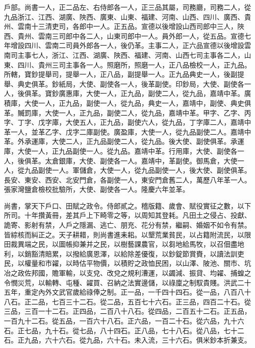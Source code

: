 戶部。尚書一人，正二品左、右侍郎各一人，正三品其屬，司務廳，司務二人，從九品浙江、江西、湖廣、陜西、廣東、山東、福建、河南、山西、四川、廣西、貴州、雲南十三清吏司，各郎中一人。正五品。宣德以後增設山西司郎中三人，陜西、貴州、雲南三司郎中各二人，山東司郎中一人。員外郎一人，從五品。宣德七年增設四川、雲南二司員外郎各一人，後仍革。主事二人，正六品宣德以後增設雲南司主事七人，浙江、江西、湖廣、陜西、福建、河南、山西七司主事各二人，山東、四川、貴州三司主事各一人。照磨所，照磨一人，正八品檢校一人，正九品。所轄，寶鈔提舉司，提舉一人，正八品，副提舉一人。正九品典史一人，後副提舉、典史俱革。鈔紙局，大使、副使各一人，後革副使。印鈔局，大使、副使各一人，後俱革。寶鈔廣惠庫，大使一人，正九品，副使二人，從九品，嘉靖中革。廣積庫，大使一人，正九品，副使一人，從九品，典史一人，嘉靖中，副使、典史俱革。贓罰庫，大使一人，正九品，副使二人，從九品，嘉靖中革。甲字、乙字、丙字、丁字、戊字庫，大使五人，正九品，副使六人，從九品，丁字庫二人，嘉靖中革一人，並革乙字、戊字二庫副使。廣盈庫，大使一人，從九品副使二人。嘉靖中革。外承運庫，大使二人，正九品副使二人，從九品。後大使、副使俱革。承運庫，大使一人，正九品副使一人。從九品。嘉靖中革。行用庫，大使、副使各一人，後俱革。太倉銀庫，大使、副使各一人。嘉靖中，革副使。御馬倉，大使一人，從九品副使一人。軍儲倉，大使一人，從九品副使一人，後大使、副使俱革。長安、東安、西安、北安門倉，各副使一人，東安門倉舊二人，萬歷八年革一人。張家灣鹽倉檢校批驗所，大使、副使各一人。隆慶六年並革。

尚書，掌天下戶口、田賦之政令。侍郎貳之。稽版籍、歲會、賦役實征之數，以下所司。十年攢黃冊，差其戶上下畸零之等，以周知其登耗。凡田土之侵占、投獻、詭寄、影射有禁，人戶之隱漏、逃亡、朋充、花分有禁，繼嗣、婚姻不如令有禁。皆綜核而糾正之。天子耕耤，則尚書進耒耜。以墾荒業貧民，以占籍附流民，以限田裁異端之民，以圖帳抑兼并之民，以樹藝課農官，以芻地給馬牧，以召佃盡地利，以銷豁清賠累，以撥給廣恩澤，以給除差優復，以鈔錠節賞賚，以讀法訓吏民，以權量和市糴，以時估平物價，以積貯之政恤民困，以山澤、陂池、關市、坑冶之政佐邦國，贍軍輸，以支兌、改兌之規利漕運，以蠲減、振貸、均糴、捕蝗之令憫災荒，以輸轉、屯種、糴買、召納之法實邊儲，以祿廩之制馭貴賤。洪武二十五年，重定內外文武官歲給祿俸之制。正一品，一千四十四石。從一品，八百八十八石。正二品，七百三十二石。從二品，五百七十六石。正三品，四百二十石。從三品，三百一十二石。正四品，二百八十八石。從四品，二百五十二石。正五品，一百九十二石。從五品，一百六十八石。正六品，一百二十石。從六品，九十六石。正七品，九十石。從七品，八十四石。正八品，七十八石。從八品，七十二石。正九品，六十六石。從九品，六十石。未入流，三十六石。俱米鈔本折兼支。

